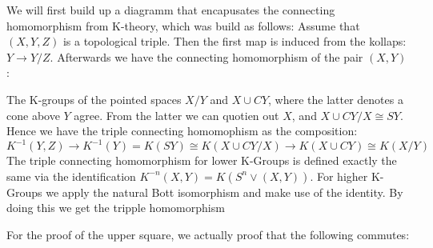 \begin{Iprove}
	We will first build up a diagramm that encapusates the connecting homomorphism from K-theory, which was build as follows: Assume that $(X,Y,Z)$ is a topological triple. Then the first map is induced from the kollaps: $Y\to Y\big/ Z$. Afterwards we have the connecting homomorphism of the pair $(X,Y)$:
	
	The K-groups of the pointed spaces $X\big/ Y$ and $X\cup CY$, where the latter denotes a cone above $Y$ agree. From the latter we can quotien out $X$, and $X\cup CY\big/ X\cong SY$. Hence we have the triple connecting homomophism as the composition:
	\begin{equation*}
		K^{-1}(Y,Z)\to	K^{-1}(Y)=K(SY)\cong K(X\cup CY\big/ X)\to K(X\cup CY)\cong K(X\big/ Y) 
	\end{equation*}The triple connecting homomorphism for lower K-Groups is defined exactly the same via the identification $K^{-n}(X,Y)=K(S^n\vee (X,Y))$. For higher K-Groups we apply the natural Bott isomorphism and make use of the identity. By doing this we get the tripple homomorphism 
	\begin{center}
	\end{center} For the proof of the upper square, we actually proof that the following commutes:
	\begin{fdiagram}\label{diag: that we really want to show}

\end{fdiagram}
\end{Iprove}

